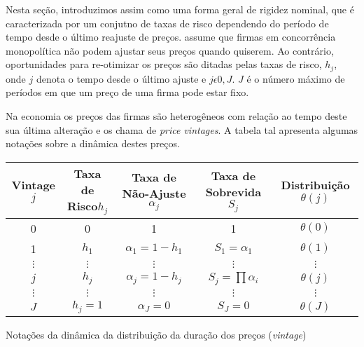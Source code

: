 \documentclass[twoside,a4paper,11pt]{report}
\begin{document}
Nesta seção, introduzimos assim como \citet{yao2010aggregate} uma forma geral de rigidez nominal, que é caracterizada por um conjutno de taxas de risco dependendo do período de tempo desde o último reajuste de preços. \citet{yao2010aggregate} assume que firmas em concorrência monopolítica não podem ajustar seus preços quando quiserem. Ao contrário, oportunidades para re-otimizar os preços são ditadas pelas taxas de risco, $h_{j}$, onde $j$ denota o tempo desde o último ajuste e $j\epsilon {0,J}$. $J$ é o número máximo de períodos em que um preço de uma firma pode estar fixo. 

Na economia os preços das firmas são heterogêneos com relação ao tempo deste sua última alteração e \citet{yao2010aggregate} os chama de \emph{price vintages}. A tabela tal apresenta algumas notações sobre a dinâmica destes preços. 

\begin{center}\label{tab01en02}
  \begin{tabular}{|c|c|c|c|c|}
    \hline 
    Vintage$j$ & Taxa de Risco$h_{j}$ & Taxa de Não-Ajuste $\alpha_{j}$ & Taxa de Sobrevida $S_{j}$ & Distribuição $\theta(j)$\tabularnewline
    \hline 
    0 & 0 & 1 & 1 & $\theta(0)$\tabularnewline
    \hline 
    1 & $h_{1}$ & $\alpha_{1}=1-h_{1}$ & $S_{1}=\alpha_{1}$ & $\theta(1)$\tabularnewline
    \hline 
    $\vdots$ & $\vdots$ & $\vdots$ & $\vdots$ & $\vdots$\tabularnewline
    \hline 
    $j$ & $h_{j}$ & $\alpha_{j}=1-h_{j}$ & $S_{j}=\prod\alpha_{i}$ & $\theta(j)$\tabularnewline
    \hline 
    $\vdots$ & $\vdots$ & $\vdots$ & $\vdots$ & $\vdots$\tabularnewline
    \hline 
    $J$ & $h_{j}=1$ & $\alpha_{J}=0$ & $S_{J}=0$ & $\theta(J)$\tabularnewline
    \hline 
  \end{tabular}
  \caption{Notações da dinâmica da distribuição da duração dos preços (\emph{vintage})} 
\end{center}
\end{document}
